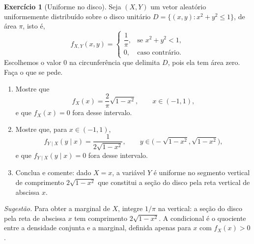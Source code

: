 \documentclass[12pt,portuguese]{article}
\theoremstyle{definition}
\theoremstyle{plainexercise}
\newtheorem{exercise}{Exercício}
\theoremstyle{starredexercise}
\theoremstyle{definition}
\begin{document}
\begin{exercise}[Uniforme no disco]\label{exercise:disco-uniforme}
Seja $(X,Y)$ um vetor aleatório uniformemente distribuído sobre o disco unitário
$D = \{(x,y) : x^2 + y^2 \leqslant 1\}$, de área $\pi$, isto é,
\begin{equation}\label{eq:uniforme-disco}
  f_{X,Y}(x,y) =
  \begin{cases}
    \dfrac{1}{\pi}, & \text{se } x^2+y^2<1, \\[0.3cm]
    0, & \text{caso contrário}.
  \end{cases}
\end{equation}
Escolhemos o valor $0$ na circunferência que delimita $D$, pois ela tem área zero.
Faça o que se pede.

\begin{enumerate}
  \item[(a)] Mostre que
  \begin{equation}\label{eq:marginal-x-disco}
    f_X(x) = \frac{2}{\pi}\sqrt{1-x^2}, \qquad x \in (-1,1),
  \end{equation}
  e que $f_X(x) = 0$ fora desse intervalo.

  \item[(b)] Mostre que, para $x \in (-1,1)$,
  \begin{equation}\label{eq:condicional-disco}
    f_{Y\mid X}(y \mid x)
    = \frac{1}{2\sqrt{1-x^2}}, \qquad
    y \in \bigl(-\sqrt{1-x^2}, \sqrt{1-x^2}\bigr),
  \end{equation}
  e que $f_{Y\mid X}(y \mid x) = 0$ fora desse intervalo.

  \item[(c)] Conclua e comente: dado $X = x$, a variável $Y$ é uniforme no segmento vertical
  de comprimento $2\sqrt{1-x^2}$ que constitui a seção do disco pela reta vertical de
  abscissa $x$.
\end{enumerate}

\emph{Sugestão.} Para obter a marginal de $X$, integre $1/\pi$ na vertical: a seção do disco
pela reta de abscissa $x$ tem comprimento $2\sqrt{1-x^2}$. A condicional é o quociente entre
a densidade conjunta e a marginal, definida apenas para $x$ com $f_X(x) > 0$.
\end{exercise}
\end{document}
